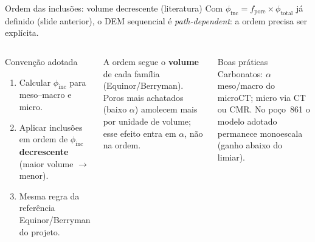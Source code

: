 \documentclass[aspectratio=169,10pt]{beamer}
\begin{document}
\begin{frame}{Ordem das inclusões: volume decrescente (literatura)}
  \footnotesize
  Com $\phi_{\mathrm{inc}}=f_{\mathrm{pore}}\times\phi_{\mathrm{total}}$ já definido
  (slide anterior), o DEM sequencial é \emph{path-dependent}: a ordem
  precisa ser explícita.
  \vspace{0.06cm}
  \begin{columns}[T,onlytextwidth]
    \begin{block}{Convenção adotada}
      \scriptsize
      \begin{enumerate}
        \item Calcular $\phi_{\mathrm{inc}}$ para meso--macro e micro.
        \item Aplicar inclusões em ordem de $\phi_{\mathrm{inc}}$
              \textbf{decrescente} (maior volume $\rightarrow$ menor).
        \item Mesma regra da referência Equinor/Berryman do projeto.
      \end{enumerate}
    \end{block}
    \vspace{0.06cm}
    {\scriptsize
    A ordem segue o \textbf{volume} de cada família (Equinor/Berryman).
    Poros mais achatados (baixo $\alpha$) amolecem mais por unidade de
    volume; esse efeito entra em $\alpha$, não na ordem.}
    \vspace{0.08cm}
    \begin{block}{Boas práticas}
      \scriptsize
      Carbonatos: $\alpha$ meso/macro do microCT; micro via CT ou CMR.
      No poço~861 o modelo adotado permanece monoescala (ganho abaixo do limiar).
    \end{block}
    \centering
  \end{columns}
\end{frame}
\end{document}
